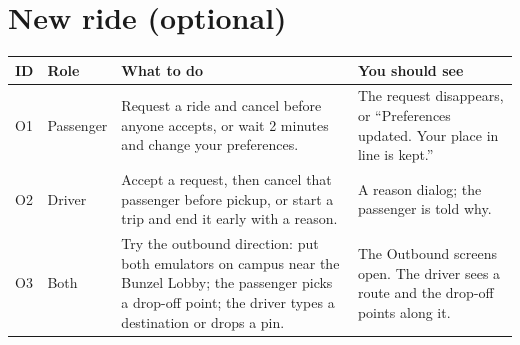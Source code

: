 \section*{New ride (optional)}
\small
\begin{longtable}{|p{1.0cm}|p{1.7cm}|p{6.2cm}|p{5.0cm}|}
\hline
\textbf{ID} & \textbf{Role} & \textbf{What to do} & \textbf{You should see} \\
\hline
\endhead
O1 & Passenger & Request a ride and cancel before anyone accepts, or wait 2 minutes and change your preferences. & The request disappears, or ``Preferences updated. Your place in line is kept.'' \\
\hline
O2 & Driver & Accept a request, then cancel that passenger before pickup, or start a trip and end it early with a reason. & A reason dialog; the passenger is told why. \\
\hline
O3 & Both & Try the outbound direction: put both emulators on campus near the Bunzel Lobby; the passenger picks a drop-off point; the driver types a destination or drops a pin. & The Outbound screens open. The driver sees a route and the drop-off points along it. \\
\hline
\end{longtable}
\normalsize

